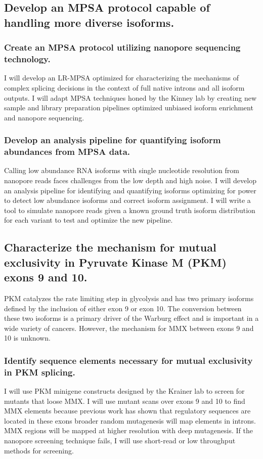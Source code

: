 \documentclass{article}
\begin{document}
\subsection{Develop an MPSA protocol capable of handling more diverse isoforms.} \label{aim:MPSA_dev}
%
\subsubsection{Create an MPSA protocol utilizing nanopore sequencing technology.} \label{aim:nanopore_screen_dev}
I will develop an LR-MPSA optimized for characterizing the mechanisms of complex splicing decisions in the context of full native introns and all isoform outputs.
I will adapt MPSA techniques honed by the Kinney lab\supercite{Wong2018-vq,Ishigami2022-bf} by creating new sample and library preparation pipelines optimized unbiased isoform enrichment and nanopore sequencing.
%
\subsubsection{Develop an analysis pipeline for quantifying isoform abundances from MPSA data.} \label{aim:pipeline_dev}
Calling low abundance RNA isoforms with single nucleotide resolution from nanopore reads faces challenges from the low depth and high noise.
I will develop an analysis pipeline for identifying and quantifying isoforms optimizing for power to detect low abundance isoforms and correct isoform assignment.
I will write a tool to simulate nanopore reads given a known ground truth isoform distribution for each variant to test and optimize the new pipeline.
%
\subsection{Characterize the mechanism for mutual exclusivity in Pyruvate Kinase M (PKM) exons 9 and 10.}
PKM catalyzes the rate limiting step in glycolysis and has two primary isoforms defined by the inclusion of either exon 9 or exon 10. 
The conversion between these two isoforms is a primary driver of the Warburg effect and is important in a wide variety of cancers.\supercite{Christofk2008-bu,Ma2022-dt} 
However, the mechanism for MMX between exons 9 and 10 is unknown.
%
\subsubsection{Identify sequence elements necessary for mutual exclusivity in PKM splicing.} \label{aim:PKM_motif_finding}
I will use PKM minigene constructs designed by the Krainer lab \supercite{Wang2012-dr} to screen for mutants that loose MMX.
I will use mutant scans over exons 9 and 10 to find MMX elements because previous work has shown that regulatory sequences are located in these exons\supercite{Wang2012-dr} broader random mutagenesis will map elements in introns.
MMX regions will be mapped at higher resolution with deep mutagenesis.
If the nanopore screening technique fails, I will use short-read or low throughput methods for screening.
%
\end{document}
